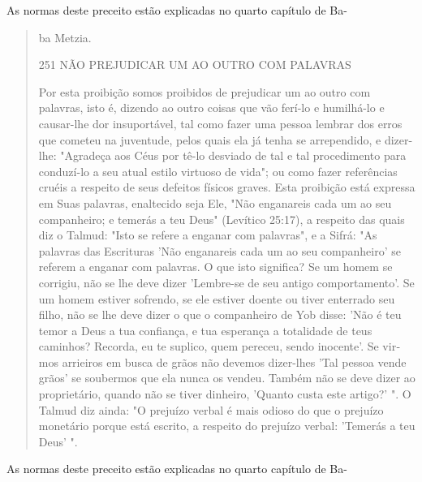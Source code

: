 As normas deste preceito estão explicadas no quarto capítulo de Ba-

\begin{quote}
ba Metzia.

251 NÃO PREJUDICAR UM AO OUTRO COM PALAVRAS

Por esta proibição somos proibidos de prejudicar um ao outro com
palavras, isto é, dizendo ao outro coisas que vão ferí-lo e humilhá-lo e
causar-lhe dor insuportável, tal como fazer uma pessoa lembrar dos erros
que come­teu na juventude, pelos quais ela já tenha se arrependido, e
dizer-lhe: "Agrade­ça aos Céus por tê-lo desviado de tal e tal
procedimento para conduzí-lo a seu atual estilo virtuoso de vida"; ou
como fazer referências cruéis a respeito de seus defeitos físicos
graves. Esta proibição está expressa em Suas palavras, enal­tecido seja
Ele, "Não enganareis cada um ao seu companheiro; e temerás a teu Deus"
(Levítico 25:17), a respeito das quais diz o Talmud: "Isto se refere a
en­ganar com palavras", e a Sifrá: "As palavras das Escrituras 'Não
enganareis cada um ao seu companheiro' se referem a enganar com
palavras. O que isto signifi­ca? Se um homem se corrigiu, não se lhe
deve dizer 'Lembre-se de seu antigo comportamento'. Se um homem estiver
sofrendo, se ele estiver doente ou ti­ver enterrado seu filho, não se
lhe deve dizer o que o companheiro de Yob disse: 'Não é teu temor a Deus
a tua confiança, e tua esperança a totalidade de teus caminhos? Recorda,
eu te suplico, quem pereceu, sendo inocente'. Se vir­mos arrieiros em
busca de grãos não devemos dizer-lhes 'Tal pessoa vende grãos' se
soubermos que ela nunca os vendeu. Também não se deve dizer ao
proprie­tário, quando não se tiver dinheiro, 'Quanto custa este artigo?'
". O Talmud diz ainda: "O prejuízo verbal é mais odioso do que o
prejuízo monetário por­que está escrito, a respeito do prejuízo verbal:
'Temerás a teu Deus' ".
\end{quote}

As normas deste preceito estão explicadas no quarto capítulo de Ba-

